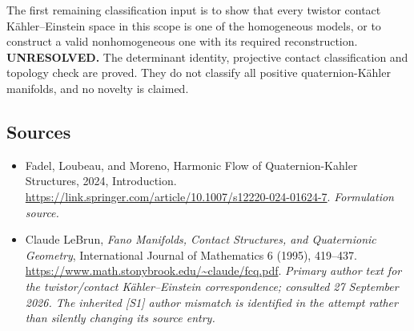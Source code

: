 \documentclass[11pt]{article}
\begin{document}
The first remaining classification input is to
show that every twistor contact K\"ahler--Einstein
space in this scope is one of the homogeneous
models, or to construct a valid nonhomogeneous
one with its required reconstruction.
\textbf{UNRESOLVED.} The determinant identity,
projective contact classification and topology
check are proved. They do not classify all
positive quaternion-K\"ahler manifolds, and
no novelty is claimed.

\subsection{Sources}
\begin{itemize}
\item[S1]Fadel, Loubeau, and Moreno, Harmonic Flow of Quaternion-Kahler Structures, 2024, Introduction.
\url{https://link.springer.com/article/10.1007/s12220-024-01624-7}.
\textit{Formulation source.}
\item[E1]Claude LeBrun, \emph{Fano Manifolds, Contact Structures, and Quaternionic Geometry}, International Journal of Mathematics 6 (1995), 419--437.
\url{https://www.math.stonybrook.edu/~claude/fcq.pdf}.
\textit{Primary author text for the twistor/contact K\"ahler--Einstein correspondence; consulted 27 September 2026. The inherited [S1] author mismatch is identified in the attempt rather than silently changing its source entry.}
\end{itemize}
\end{document}
